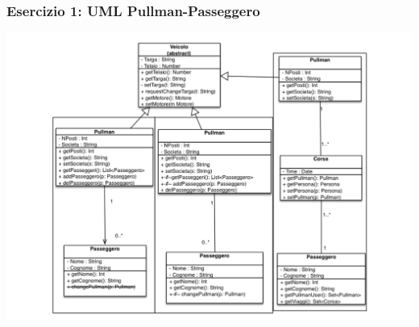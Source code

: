 \documentclass{beamer}
\begin{document}
\begin{frame}
\frametitle{Esercizio 1: UML Pullman-Passeggero}
\includegraphics[scale=0.38]{Img/pullmanpasseggero.pdf}

\end{frame}
\end{document}
